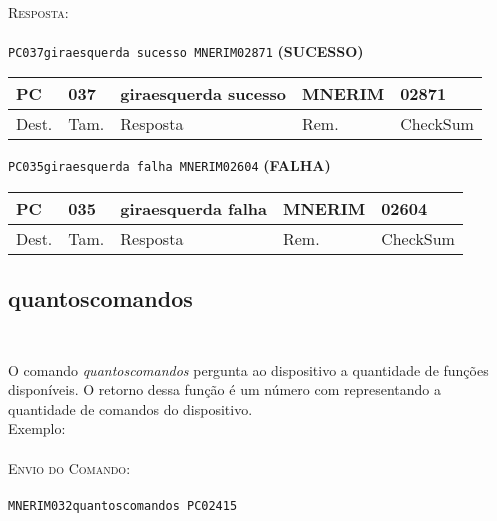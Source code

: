 \documentclass[11pt,	 papera4]{article}
\begin{document}
\paragraph*{\newline\newline}
\hspace*{0.8cm}\textsc{Resposta:} \\\\ \hspace*{2cm}\texttt{PC037giraesquerda sucesso MNERIM02871} \hspace*{2cm}\textbf{(SUCESSO)}

\begin{table}[h]
	\centering
	\begin{tabular}{p{1cm}p{1cm}p{3.5cm}p{2cm}p{2cm}}
		\toprule
		PC & 037 &giraesquerda sucesso  & MNERIM & 02871 \\
		\midrule	
		Dest. & Tam. & Resposta & Rem. & CheckSum \\
		\bottomrule
	\end{tabular}
	\label{tab:formatoslatex} %
\end{table}

\hspace*{1.2cm} \texttt{PC035giraesquerda falha MNERIM02604} \hspace*{2.5cm}\textbf{(FALHA)}

\begin{table}[h]
	\centering
	\begin{tabular}{p{1cm}p{1cm}p{3.5cm}p{2cm}p{2cm}}
		\toprule
		PC & 035 &giraesquerda falha  & MNERIM & 02604 \\
		\midrule	
		Dest. & Tam. & Resposta & Rem. & CheckSum \\
		\bottomrule
	\end{tabular}
	\label{tab:formatoslatex} %
\end{table}

\newpage

\subsection*{quantoscomandos \\\\}
O comando \textit{quantoscomandos} pergunta ao dispositivo a quantidade de funções disponíveis. O retorno dessa função é um número com representando a quantidade de comandos do dispositivo.\\
\newline
Exemplo:\\\\ \hspace*{0.5cm} 
\textsc{Envio do Comando:} \\\\ \hspace*{2cm} \texttt{MNERIM032quantoscomandos PC02415} \\
\end{document}
